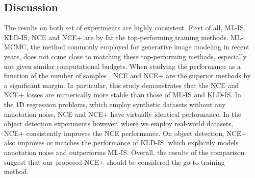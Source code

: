 \documentclass{bmvc2k}
\begin{document}
\subsection{Discussion}\label{section:comparison-Observations}
The results on both set of experiments are highly consistent. First of all, ML-IS, KLD-IS, NCE and NCE+ are by far the top-performing training methods. ML-MCMC, the method commonly employed for generative image modeling in recent years, does not come close to matching these top-performing methods, especially not given similar computational budgets. When studying the performance as a function of the number of samples , NCE and NCE+ are the superior methods by a significant margin. In particular, this study demonstrates that the NCE and NCE+ losses are  numerically more stable than those of ML-IS and KLD-IS. In the 1D regression problems, which employ synthetic datasets without any annotation noise, NCE and NCE+ have virtually identical performance. In the object detection experiments however, where we employ real-world datasets, NCE+ consistently improves the NCE performance. On object detection, NCE+ also improves or matches the performance of KLD-IS, which explicitly models annotation noise and outperforms ML-IS. Overall, the results of the comparison suggest that our proposed NCE+ should be considered the go-to training method. 
\end{document}

